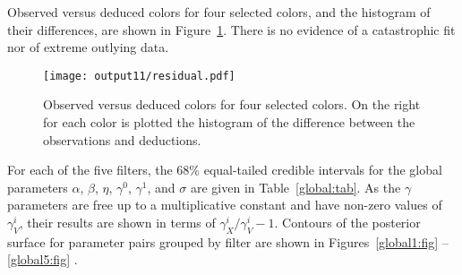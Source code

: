 \documentclass{aastex61}   	%
\begin{document}
\color{orange}
Observed versus deduced colors for four selected colors, and the histogram of their differences,
\color{black}
are shown in Figure~\ref{residual:fig}.
There is no evidence of a catastrophic fit nor of extreme
outlying data.

\begin{figure}[htbp] %
   \centering
   \texttt{[image: output11/residual.pdf]} 
            \caption{
            \color{orange}
            Observed versus deduced colors for four selected colors.
On the right for each color is plotted the histogram of the difference between the observations and deductions.
\color{black}
            \label{residual:fig}}
\end{figure}


For each of the five filters, the 68\%  equal-tailed credible intervals for the global parameters $\alpha$, $\beta$, $\eta$, $\gamma^0$, $\gamma^1$, and $\sigma$
are given in Table~\ref{global:tab}.
As the $\gamma$ parameters are free up to a multiplicative constant and have non-zero values of $\gamma^i_V$,
their results are shown in terms of $\gamma^i_X/\gamma^i_V-1$.
Contours of the posterior surface for parameter pairs grouped by filter are shown in Figures~\ref{global1:fig} -- \ref{global5:fig} .
\end{document}
